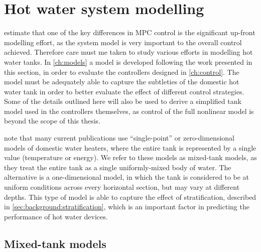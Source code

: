 \section{Hot water system modelling}

 estimate that one of the key differences in MPC control is the significant up-front modelling effort, as the system model is very important to the overall control achieved.
Therefore care must me taken to study various efforts in modelling hot water tanks.
In \autoref{ch:models} a model is developed following the work presented in this section, in order to evaluate the controllers designed in \autoref{ch:control}.
The model must be adequately able to capture the subtleties of the domestic hot water tank in order to better evaluate the effect of different control strategies.
Some of the details outlined here will also be used to derive a simplified tank model used in the controllers themselves, as control of the full nonlinear model is beyond the scope of this thesis.

\textcite{Vrettos12} note that many current publications use ``single-point'' or zero-dimensional models of domestic water heaters, where the entire tank is represented by a single value (temperature or energy).
We refer to these models as mixed-tank models, as they treat the entire tank as a single uniformly-mixed body of water.
The alternative is a one-dimensional model, in which the tank is considered to be at uniform conditions across every horizontal section, but may vary at different depths.
This type of model is able to capture the effect of stratification, described in \autoref{sec:background:stratification}, which is an important factor in predicting the performance of hot water devices.

\subsection{Mixed-tank models}
\label{sec:review:mixed-tank}



